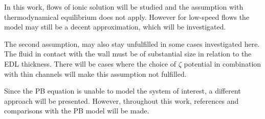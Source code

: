 In this work, flows of ionic solution will be studied and the
assumption with thermodynamical equilibrium does not apply. However
for low-speed flows the model may still be a decent approximation,
which will be investigated. 

The second assumption, may also stay unfulfilled in some cases
investigated here. The fluid in contact with the wall must be of
substantial size in relation to the EDL thickness. There will be
cases where the choice of $\zeta$ potential in combination with thin
channels will make this assumption not fulfilled.

Since the PB equation is unable to model the system of
interest, a different approach will be presented. However, throughout
this work, references and comparisons with the PB model will be made. 




